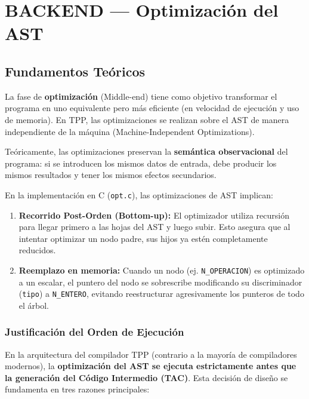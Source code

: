 \chapter{BACKEND — Optimización del AST}

\section{Fundamentos Teóricos}

La fase de \textbf{optimización} (Middle-end) tiene como objetivo transformar el programa en uno equivalente pero más eficiente (en velocidad de ejecución y uso de memoria). En TPP, las optimizaciones se realizan sobre el AST de manera independiente de la máquina (Machine-Independent Optimizations).

Teóricamente, las optimizaciones preservan la \textbf{semántica observacional} del programa: si se introducen los mismos datos de entrada, debe producir los mismos resultados y tener los mismos efectos secundarios.

\begin{infobox}
En la implementación en C (\texttt{opt.c}), las optimizaciones de AST implican:
\begin{enumerate}
    \item \textbf{Recorrido Post-Orden (Bottom-up):} El optimizador utiliza recursión para llegar primero a las hojas del AST y luego subir. Esto asegura que al intentar optimizar un nodo padre, sus hijos ya estén completamente reducidos.
    \item \textbf{Reemplazo en memoria:} Cuando un nodo (ej. \texttt{N\_OPERACION}) es optimizado a un escalar, el puntero del nodo se sobrescribe modificando su discriminador (\texttt{tipo}) a \texttt{N\_ENTERO}, evitando reestructurar agresivamente los punteros de todo el árbol.
\end{enumerate}
\end{infobox}

\subsection{Justificación del Orden de Ejecución}

En la arquitectura del compilador TPP (contrario a la mayoría de compiladores modernos), la \textbf{optimización del AST se ejecuta estrictamente antes que la generación del Código Intermedio (TAC)}. Esta decisión de diseño se fundamenta en tres razones principales:

